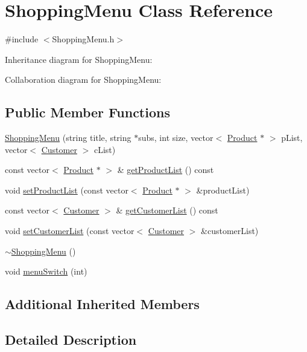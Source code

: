 \hypertarget{classShoppingMenu}{}\section{Shopping\+Menu Class Reference}
\label{classShoppingMenu}


{\ttfamily \#include $<$Shopping\+Menu.\+h$>$}



Inheritance diagram for Shopping\+Menu\+:


Collaboration diagram for Shopping\+Menu\+:
\subsection*{Public Member Functions}
\begin{DoxyCompactItemize}
\item 
\hyperlink{classShoppingMenu_a1a36a442a55a5bca62a0e3761d9f5a7d}{Shopping\+Menu} (string title, string $\ast$subs, int size, vector$<$ \hyperlink{classProduct}{Product} $\ast$ $>$ p\+List, vector$<$ \hyperlink{classCustomer}{Customer} $>$ c\+List)
\item 
const vector$<$ \hyperlink{classProduct}{Product} $\ast$ $>$ \& \hyperlink{classShoppingMenu_af81a1862b9ec3cb70ff437b3de2f5461}{get\+Product\+List} () const 
\item 
void \hyperlink{classShoppingMenu_aff37e8a9d68eb29c6494999f41f3dd71}{set\+Product\+List} (const vector$<$ \hyperlink{classProduct}{Product} $\ast$ $>$ \&product\+List)
\item 
const vector$<$ \hyperlink{classCustomer}{Customer} $>$ \& \hyperlink{classShoppingMenu_a8d017a65d151d79156bcee91c42aae7f}{get\+Customer\+List} () const 
\item 
void \hyperlink{classShoppingMenu_a130e9b603e0307a6bc89e315b2ca968f}{set\+Customer\+List} (const vector$<$ \hyperlink{classCustomer}{Customer} $>$ \&customer\+List)
\item 
\hyperlink{classShoppingMenu_a505b7c469fb8115c26e2f7b5a9b8d9e6}{$\sim$\+Shopping\+Menu} ()
\item 
void \hyperlink{classShoppingMenu_a2ae4f8b4fafbf970b454be146858c3d6}{menu\+Switch} (int)
\end{DoxyCompactItemize}
\subsection*{Additional Inherited Members}


\subsection{Detailed Description}

